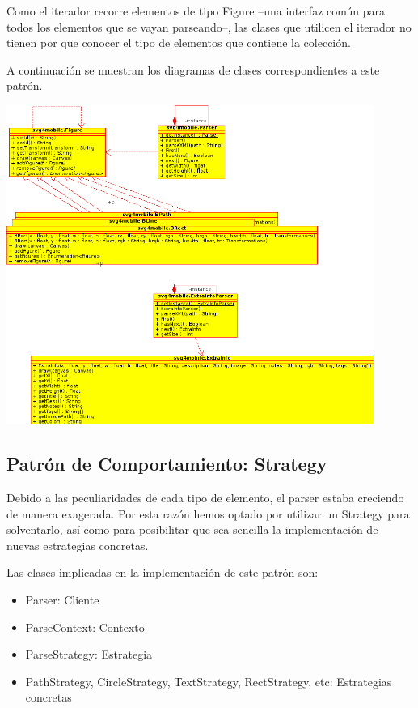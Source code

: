 \documentclass[a4paper,10pt]{article}
\begin{document}
Como el iterador recorre elementos de tipo Figure --una interfaz común para todos los elementos que se vayan parseando--, las clases que utilicen el iterador no tienen por que conocer el tipo de elementos que contiene la colección.

A continuación se muestran los diagramas de clases correspondientes a este patrón.

\begin{center}
 \includegraphics[width=12cm]{texres/iterator.png}
\end{center}

\subsection{Patrón de Comportamiento: Strategy}
Debido a las peculiaridades de cada tipo de elemento, el parser estaba creciendo de manera exagerada. Por esta razón hemos optado por utilizar un Strategy para solventarlo, así como para posibilitar que sea sencilla la implementación de nuevas estrategias concretas. 

Las clases implicadas en la implementación de este patrón son:

\begin{itemize}
\item Parser: Cliente
\item ParseContext: Contexto
\item ParseStrategy: Estrategia
\item PathStrategy, CircleStrategy, TextStrategy, RectStrategy, etc: Estrategias concretas
\end{itemize}
\end{document}
